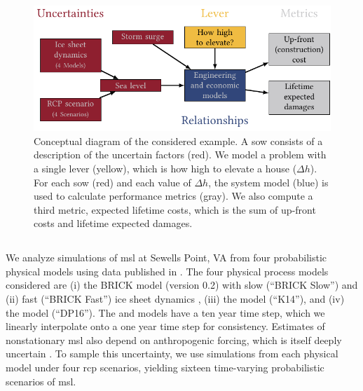 \documentclass{agujournal2019}
\begin{document}
\begin{figure}
  \centering
  \includegraphics[width=\textwidth]{xlrm.pdf}
  \caption{
    Conceptual diagram of the considered example.
    A \acrfull{sow} consists of a description of the uncertain factors (red).
    We model a problem with a single lever (yellow), which is how high to elevate a house ($\Delta h$).
    For each \acrshort{sow} (red) and each value of $\Delta h$, the system model (blue) is used to calculate performance metrics (gray).
    We also compute a third metric, expected lifetime costs, which is the sum of up-front costs and lifetime expected damages.
  }\label{fig:xlrm}
\end{figure}

\subsection{}\label{sec:case-slr}

We analyze simulations of \gls{msl} at Sewells Point, VA from four probabilistic physical models using data published in .
The four physical process models considered are (i) the BRICK model (version 0.2) with slow (``BRICK Slow'') and (ii) fast (``BRICK Fast'') ice sheet dynamics \cite{wong_brick0.2:2017}, (iii) the  model (``K14''), and (iv) the  model (``DP16'').
The  and  models have a ten year time step, which we linearly interpolate onto a one year time step for consistency.
Estimates of nonstationary \gls{msl} also depend on anthropogenic forcing, which is itself deeply uncertain \cite{ho_scenarios:2019,srikrishnan_probabilistic:2022}.
To sample this uncertainty, we use simulations from each physical model under four \gls{rcp} scenarios, yielding sixteen time-varying probabilistic scenarios of \gls{msl}.
\end{document}
